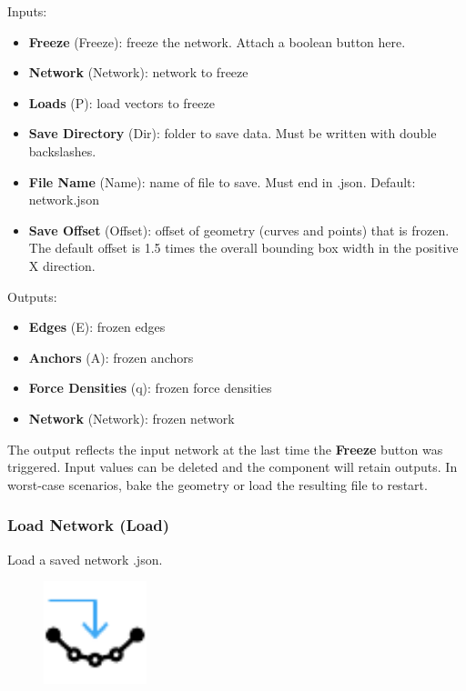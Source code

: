 Inputs:
\begin{itemize}
    \setlength\itemsep{0.05em}
    \item \textbf{Freeze} (Freeze): freeze the network. Attach a boolean button here.
    \item \textbf{Network} (Network): network to freeze
    \item \textbf{Loads} (P): load vectors to freeze
    \item \textbf{Save Directory} (Dir): folder to save data. Must be written with double backslashes.
    \item \textbf{File Name} (Name): name of file to save. Must end in .json.{\color{gray} Default: network.json}
    \item \textbf{Save Offset} (Offset): offset of geometry (curves and points) that is frozen. The default offset is 1.5 times the overall bounding box width in the positive X direction.
\end{itemize}

Outputs:
\begin{itemize}
    \setlength\itemsep{0.05em}
    \item \textbf{Edges} (E): frozen edges
    \item \textbf{Anchors} (A): frozen anchors
    \item \textbf{Force Densities} (q): frozen force densities
    \item \textbf{Network} (Network): frozen network
\end{itemize}

The output reflects the input network at the last time the \textbf{Freeze} button was triggered. Input values can be deleted and the component will retain outputs. In worst-case scenarios, bake the geometry or load the resulting file to restart.

\subsubsection{Load Network (Load)}\label{Load}
Load a saved network .json.

\begin{figure}[h]
    \centering
    \includegraphics[width=3cm]{Figures/import}
\end{figure}

